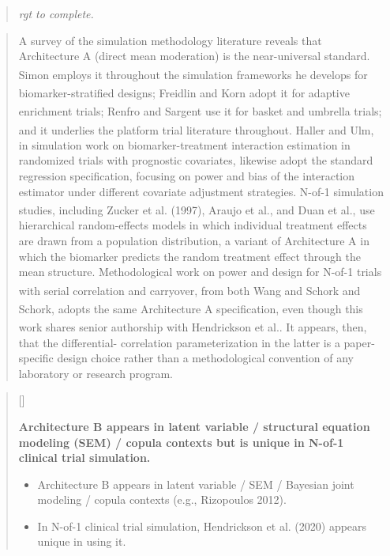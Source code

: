 \documentclass[
  11pt,
]{article}
\newcounter{pgraph}
\newenvironment{bullets}{%
  \stepcounter{pgraph}%
  \begin{quote}\small\sffamily\color[gray]{0.30}%
  {\normalfont\scriptsize\color[gray]{0.58}[\thepgraph]\enspace}}{%
  \end{quote}}
\newenvironment{rgt}{%
  \begin{quote}\small\itshape\color[RGB]{20,60,160}}{%
  \end{quote}}
\newenvironment{orig}{%
  \begin{quote}\normalsize\color[gray]{0.55}}{%
  \end{quote}}
\begin{document}
\begin{rgt}
rgt to complete.

\end{rgt}

\begin{orig}
A survey of the simulation methodology literature reveals that
Architecture A (direct mean moderation) is the near-universal standard.
Simon\textsuperscript{} employs it throughout
the simulation frameworks he develops for biomarker-stratified designs;
Freidlin and Korn\textsuperscript{} adopt
it for adaptive enrichment trials; Renfro and
Sargent\textsuperscript{} use it for basket
and umbrella trials; and it underlies the platform trial literature
throughout. Haller and
Ulm\textsuperscript{}, in simulation work on
biomarker-treatment interaction estimation in randomized trials with
prognostic covariates, likewise adopt the standard regression
specification, focusing on power and bias of the interaction estimator
under different covariate adjustment strategies. N-of-1 simulation
studies, including Zucker et al. (1997), Araujo et
al.\textsuperscript{}, and Duan et
al.\textsuperscript{}, use hierarchical
random-effects models in which individual treatment effects are drawn
from a population distribution, a variant of Architecture A in which the
biomarker predicts the random treatment effect through the mean
structure. Methodological work on power and design for N-of-1 trials
with serial correlation and carryover, from both Wang and
Schork\textsuperscript{} and
Schork\textsuperscript{}, adopts the same
Architecture A specification, even though this work shares senior
authorship with Hendrickson et
al.\textsuperscript{}. It appears,
then, that the differential- correlation parameterization in the latter
is a paper-specific design choice rather than a methodological
convention of any laboratory or research program.

\end{orig}

\begin{bullets}

\textbf{Architecture B appears in latent variable / structural
equation modeling (SEM) /
copula contexts but is unique in N-of-1 clinical trial
simulation.}

\begin{itemize}\setlength{\itemsep}{2pt}\setlength{\parskip}{0pt}
\item Architecture B appears in latent variable / SEM /
  Bayesian joint modeling / copula contexts (e.g., Rizopoulos
  2012).
\item In N-of-1 clinical trial simulation, Hendrickson et al.
  (2020) appears unique in using it.
\end{itemize}

\end{bullets}
\end{document}
